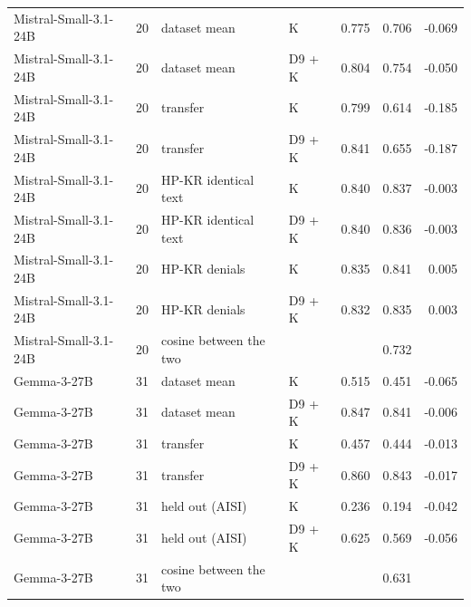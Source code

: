 \begin{table}
\begin{tabular}{lrllrrr}
Mistral-Small-3.1-24B & 20 & dataset mean & K & 0.775 & 0.706 & -0.069 \\
Mistral-Small-3.1-24B & 20 & dataset mean & D9 + K & 0.804 & 0.754 & -0.050 \\
Mistral-Small-3.1-24B & 20 & transfer & K & 0.799 & 0.614 & -0.185 \\
Mistral-Small-3.1-24B & 20 & transfer & D9 + K & 0.841 & 0.655 & -0.187 \\
Mistral-Small-3.1-24B & 20 & HP-KR identical text & K & 0.840 & 0.837 & -0.003 \\
Mistral-Small-3.1-24B & 20 & HP-KR identical text & D9 + K & 0.840 & 0.836 & -0.003 \\
Mistral-Small-3.1-24B & 20 & HP-KR denials & K & 0.835 & 0.841 & 0.005 \\
Mistral-Small-3.1-24B & 20 & HP-KR denials & D9 + K & 0.832 & 0.835 & 0.003 \\
Mistral-Small-3.1-24B & 20 & cosine between the two &  &  & 0.732 &  \\
Gemma-3-27B & 31 & dataset mean & K & 0.515 & 0.451 & -0.065 \\
Gemma-3-27B & 31 & dataset mean & D9 + K & 0.847 & 0.841 & -0.006 \\
Gemma-3-27B & 31 & transfer & K & 0.457 & 0.444 & -0.013 \\
Gemma-3-27B & 31 & transfer & D9 + K & 0.860 & 0.843 & -0.017 \\
Gemma-3-27B & 31 & held out (AISI) & K & 0.236 & 0.194 & -0.042 \\
Gemma-3-27B & 31 & held out (AISI) & D9 + K & 0.625 & 0.569 & -0.056 \\
Gemma-3-27B & 31 & cosine between the two &  &  & 0.631 &  \\
\bottomrule
\end{tabular}
\end{table}
